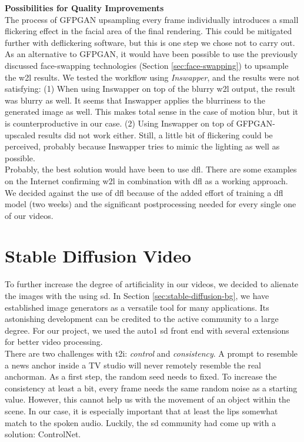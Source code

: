 \documentclass[
  a4paper,  %
  twoside,  %
  bibliography=totoc,
  headsepline,
  cleardoublepage=empty,
  parskip=half,
  draft=false
]{scrbook}
\begin{document}
\textbf{Possibilities for Quality Improvements} \\
The process of GFPGAN upsampling every frame individually introduces a small flickering effect in the facial area of the final rendering. This could be mitigated further with deflickering software, but this is one step we chose not to carry out. As an alternative to GFPGAN, it would have been possible to use the previously discussed face-swapping technologies (Section \ref{sec:face-swapping}) to upsample the \gls{w2l} results. We tested the workflow using \textit{Inswapper}, and the results were not satisfying: (1) When using Inswapper on top of the blurry \gls{w2l} output, the result was blurry as well. It seems that Inswapper applies the blurriness to the generated image as well. This makes total sense in the case of motion blur, but it is counterproductive in our case. (2) Using Inswapper on top of GFPGAN-upscaled results did not work either. Still, a little bit of flickering could be perceived, probably because Inswapper tries to mimic the lighting as well as possible. \\
Probably, the best solution would have been to use \gls{dfl}. There are some examples on the Internet confirming \gls{w2l} in combination with \gls{dfl} as a working approach. We decided against the use of \gls*{dfl} because of the added effort of training a \gls{dfl} model (two weeks) and the significant postprocessing needed for every single one of our videos. 


\section{Stable Diffusion Video}
\label{sec:sd-video}
To further increase the degree of artificiality in our videos, we decided to alienate the images with the using \gls{sd}. In Section \ref{sec:stable-diffusion-bg}, we have established image generators as a versatile tool for many applications. Its astonishing development can be credited to the active community to a large degree. For our project, we used the \gls{auto1} \gls{sd} front end with several extensions for better video processing. \\
There are two challenges with \gls{t2i}: \textit{control} and \textit{consistency}. A prompt to resemble a news anchor inside a TV studio will never remotely resemble the real anchorman. As a first step, the random seed needs to fixed. To increase the consistency at least a bit, every frame needs the same random noise as a starting value. However, this cannot help us with the movement of an object within the scene. In our case, it is especially important that at least the lips somewhat match to the spoken audio. Luckily, the \gls{sd} community had come up with a solution: ControlNet.
\end{document}
